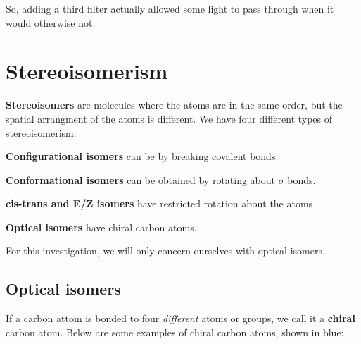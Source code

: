 \documentclass{paper}
\begin{document}
So, adding a third filter actually allowed some light to pass through when it would otherwise not.

\section{Stereoisomerism}

\textbf{Stereoisomers} are molecules where the atoms are in the same order, but the spatial arrangment of the atoms is different. We have four different types of stereoisomerism:

\begin{boldenumerate}
\item \textbf{Configurational isomers} can be  by breaking covalent bonds.
\item \textbf{Conformational isomers} can be obtained by rotating about $\sigma$ bonds.
\item \textbf{cis-trans and E/Z isomers} have restricted rotation about the atoms
\item \textbf{Optical isomers} have chiral carbon atoms.
\end{boldenumerate}

For this investigation, we will only concern ourselves with optical isomers.

\subsection{Optical isomers}
If a carbon attom is bonded to four \textit{different} atoms or groups, we call it a \textbf{chiral} carbon atom. Below are some examples of chiral carbon atoms, shown in blue:

\begin{figure}[H]
\label{fig:chiral-carbon-atoms}
\caption{Examples of chiral carbon atoms}
\begin{subfigure}[t]{.49\textwidth}
\centering
{} 
\end{subfigure}
\begin{subfigure}[t]{.49\textwidth}
\centering
{} 
\end{subfigure}

\vspace{25pt}

\begin{subfigure}[t]{.49\textwidth}
\centering
{} 
\end{subfigure}
\begin{subfigure}[t]{.49\textwidth}
\centering
{} 
\end{subfigure}


\end{figure}
\end{document}
